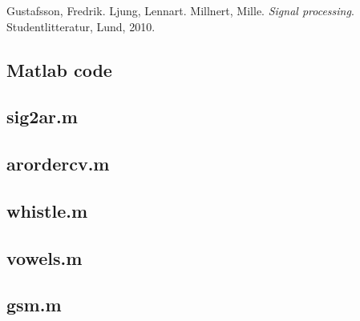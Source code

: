 \documentclass{IEEEtran}
\begin{document}
\begin{thebibliography}{9}

  Gustafsson, Fredrik. Ljung, Lennart. Millnert, Mille.
  \textit{Signal processing}.
  Studentlitteratur, Lund,
  2010.

\end{thebibliography}
\newpage
\begin{appendices}
    \section{Matlab code}
    \subsection{sig2ar.m}\label{code:sig2ar}
    
    \subsection{arordercv.m}\label{code:arordercv}
    
    \subsection{whistle.m}\label{code:whistle}
    
    \subsection{vowels.m}\label{code:vowels}
    
    \subsection{gsm.m}\label{code:gsm}
    
\end{appendices}
\end{document}
